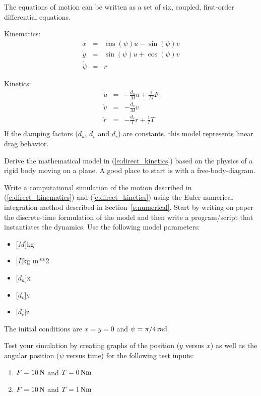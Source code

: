 The equations of motion can be written as  a set of six, coupled, first-order differential equations.

\noindent
Kinematics:
\begin{eqnarray}\label{e:direct_kinematics}
\dot{x} & = & \cos{(\psi)}u - \sin{(\psi)}v \\
\dot{y} & = & \sin{(\psi)}u + \cos{(\psi)}v \\
\dot{\psi} & = & r
\end{eqnarray}

\noindent
Kinetics:
\begin{eqnarray}\label{e:direct_kinetics}
\dot{u} & = & -\frac{d_u}{M}u + \frac{1}{M}F \\
\dot{v} & = & -\frac{d_v}{M}v \\
\dot{r} & = & -\frac{d_r}{I}r + \frac{1}{I}T \\
\end{eqnarray}
If the damping factors ($d_u$, $d_v$ and $d_r$) are constants, this model represents linear drag behavior.

\begin{ex}
Derive the mathematical model in (\ref{e:direct_kinetics}) based on the physics of a rigid body moving on a plane.  A good place to start is with a free-body-diagram.
\end{ex}

\begin{ex}
Write a computational simulation of the motion described in (\ref{e:direct_kinematics}) and (\ref{e:direct_kinetics}) using the Euler numerical integration method described in Section~\ref{s:numerical}.  Start by writing on paper the discrete-time formulation of the model and then write a program/script that instantiates the dynamics.  Use the following model parameters:
\begin{itemize}
\item \unit[$M$]{kg}
\item \unit[$I$]{kg m**2}
\item \unit[$d_u$]{x}
\item \unit[$d_v$]{y}
\item \unit[$d_r$]{z}
\end{itemize}

\noindent
The initial conditions are $x=y=0$ and $\psi = \unit[\pi/4]{rad}$.  

\noindent
Test your simulation by creating graphs of the position ($y$ versus $x$) as well as the angular position ($\psi$ versus time) for the following test inputs:
\begin{enumerate}
\item $F = \unit[10]{N}$ and $T = \unit[0]{Nm}$
\item $F = \unit[10]{N}$ and $T = \unit[1]{Nm}$
\end{enumerate}
\end{ex}

